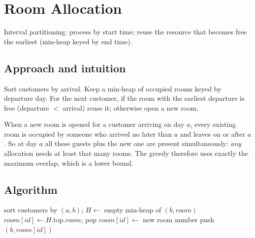 \section{Room Allocation}
\label{sec:g-room}


\begin{patternbox}
Interval partitioning: process by start time; reuse the resource that becomes
free the earliest (min-heap keyed by end time).
\end{patternbox}

\subsection*{Approach and intuition}

Sort customers by arrival. Keep a min-heap of occupied rooms keyed by
departure day. For the next customer, if the room with the earliest departure
is free (departure $<$ arrival) reuse it; otherwise open a new room.

\begin{ideabox}
When a new room is opened for a customer arriving on day $a$, every existing
room is occupied by someone who arrived no later than $a$ and leaves on or
after $a$. So at day $a$ all these guests plus the new one are present
simultaneously: \emph{any} allocation needs at least that many rooms. The
greedy therefore uses exactly the maximum overlap, which is a lower bound.
\end{ideabox}

\subsection*{Algorithm}
\begin{algorithmic}[1]
\State sort customers by $(a,b)$; $H\gets$ empty min-heap of $(b,room)$
   \State $room[id]\gets H.\text{top}.room$; pop
  \Else \State $room[id]\gets$ new room number \EndIf
  \State push $(b,room[id])$
\EndFor
\end{algorithmic}



